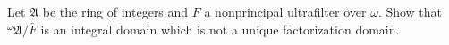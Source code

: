 Let $\mathfrak{A}$ be the ring of integers and $F$ a nonprincipal ultrafilter over $\omega$. Show that $^{\omega}\mathfrak{A} / \bar{F}$ is an integral domain which is not a unique factorization domain.
